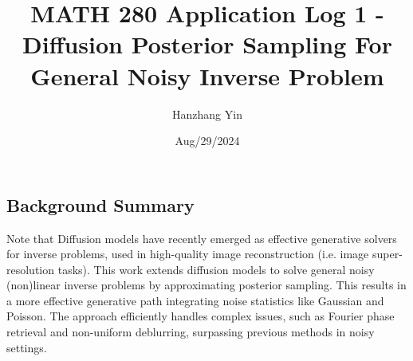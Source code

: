\documentclass{article}
\title{MATH 280 Application Log 1 - Diffusion Posterior Sampling For General Noisy Inverse Problem}
\author{Hanzhang Yin}
\date{Aug/29/2024}
\begin{document}
\maketitle

\subsection*{Background Summary}
Note that Diffusion models have recently emerged as effective generative solvers for inverse problems, used in high-quality image reconstruction (i.e. image super-resolution tasks). This work extends diffusion models to solve general noisy (non)linear inverse problems by approximating posterior sampling. This results in a more effective generative path integrating noise statistics like Gaussian and Poisson. The approach efficiently handles complex issues, such as Fourier phase retrieval and non-uniform deblurring, surpassing previous methods in noisy settings.
\end{document}
